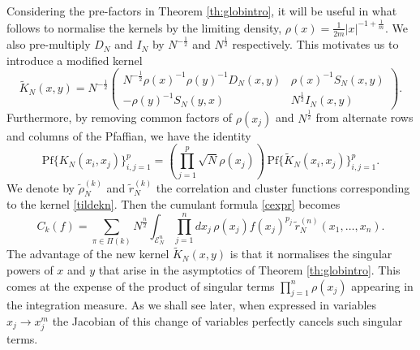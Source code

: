 \documentclass[11pt,reqno]{amsproc}
\numberwithin{equation}{section}
\numberwithin{theorem}{section}
\begin{document}
Considering the pre-factors in Theorem \ref{th:globintro}, it will be useful in what follows to normalise the kernels by the limiting density, $\rho(x) = \frac{1}{2m}|x|^{-1+\frac{1}{m}}$. We also pre-multiply $D_{N}$ and $I_{N}$ by $N^{-\frac{1}{2}}$ and $N^{\frac{1}{2}}$ respectively. This motivates us to introduce a modified kernel 
\begin{equation}
\tilde{K}_{N}(x,y) = N^{-\frac{1}{2}}\begin{pmatrix} N^{-\frac{1}{2}}\rho(x)^{-1}\rho(y)^{-1}D_{N}(x,y) & \rho(x)^{-1}S_{N}(x,y)\\ -\rho(y)^{-1}S_{N}(y,x) & N^{\frac{1}{2}}I_{N}(x,y)\end{pmatrix}. \label{tildekn}
\end{equation}
Furthermore, by removing common factors of $\rho(x_j)$ and $N^{\frac{1}{2}}$ from alternate rows and columns of the Pfaffian, we have the identity
\begin{equation}
\mathrm{Pf}\{K_{N}(x_i,x_j)\}_{i,j=1}^{p} = \left(\prod_{j=1}^{p}\sqrt{N}\rho(x_j)\right)\,\mathrm{Pf}\{\tilde{K}_{N}(x_i,x_j)\}_{i,j=1}^{p}.
\end{equation}
We denote by $\tilde{\rho}^{(k)}_{N}$ and $\tilde{r}^{(k)}_{N}$ the correlation and cluster functions corresponding to the kernel \eqref{tildekn}. Then the cumulant formula \eqref{cexpr} becomes
\begin{equation}
C_{k}(f) = \sum_{\pi \in \Pi(k)}N^{\frac{n}{2}}\int_{\mathcal{E}_{N}^{n}}\prod_{j=1}^{n}dx_{j}\,\rho(x_j)f(x_j)^{p_j}\,\tilde{r}^{(n)}_{N}(x_1,\ldots,x_n). \label{cexpr2}
\end{equation}
The advantage of the new kernel $\tilde{K}_{N}(x,y)$ is that it normalises the singular powers of $x$ and $y$ that arise in the asymptotics of Theorem \ref{th:globintro}. This comes at the expense of the product of singular terms $\prod_{j=1}^{n}\rho(x_j)$ appearing in the integration measure. As we shall see later, when expressed in variables $x_{j} \to x_{j}^{m}$ the Jacobian of this change of variables perfectly cancels such singular terms.
\end{document}
